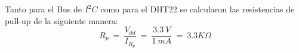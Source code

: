 Tanto para el Bus de $I^2C$ como para el DHT22 se calcularon las resistencias de pull-up de la siguiente manera:
\begin{equation}
R_p \ = \  \frac{V_{dd}}{I_{R_p}} \ = \ \frac{3.3 \ V}{1 \ mA} \ = \ 3.3K\Omega  
\end{equation}
